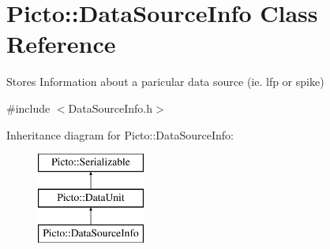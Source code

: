 \hypertarget{class_picto_1_1_data_source_info}{\section{Picto\-:\-:Data\-Source\-Info Class Reference}
\label{class_picto_1_1_data_source_info}
}


Stores Information about a paricular data source (ie. lfp or spike)  




{\ttfamily \#include $<$Data\-Source\-Info.\-h$>$}

Inheritance diagram for Picto\-:\-:Data\-Source\-Info\-:\begin{figure}[H]
\begin{center}
\leavevmode
\includegraphics[height=3.000000cm]{class_picto_1_1_data_source_info}
\end{center}
\end{figure}
